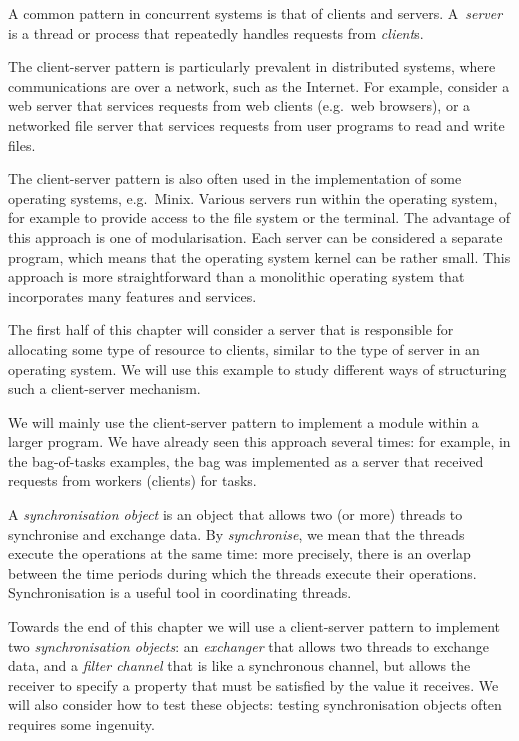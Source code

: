 A common pattern in concurrent systems is that of clients and servers.
A~\emph{server} is a thread or process that repeatedly handles requests from
\emph{client}s.

The client-server pattern is particularly prevalent in distributed systems,
where communications are over a network, such as the Internet.  For example,
consider a web server that services requests from web clients (e.g.~web
browsers), or a networked file server that services requests from user
programs to read and write files.

The client-server pattern is also often used in the implementation of some
operating systems, e.g.~Minix.  Various servers run within the operating
system, for example to provide access to the file system or the terminal.  The
advantage of this approach is one of modularisation.  Each server can be
considered a separate program, which means that the operating system kernel
can be rather small.  This approach is more straightforward than a monolithic
operating system that incorporates many features and services.

The first half of this chapter will consider a server that is responsible for
allocating some type of resource to clients, similar to the type of server in
an operating system.  We will use this example to study different ways of
structuring such a client-server mechanism.

We will mainly use the client-server pattern to implement a module within a
larger program.  We have already seen this
approach several times: for example, in the bag-of-tasks examples, the bag was
implemented as a server that received requests from workers (clients) for
tasks.
 
A \emph{synchronisation object} is an object that allows two (or more) threads
to synchronise and exchange data.  By \emph{synchronise}, we mean that the
threads execute the operations at the same time: more precisely, there is an
overlap between the time periods during which the threads execute their
operations.  Synchronisation is a useful tool in coordinating threads. 

Towards the end of this chapter we will use a client-server pattern to
implement two \emph{synchronisation objects}: an \emph{exchanger} that allows
two threads to exchange data, and a \emph{filter channel} that is like a
synchronous channel, but allows the receiver to specify a property that must
be satisfied by the value it receives.  We will also consider how to test
these objects: testing synchronisation objects often requires some ingenuity.

